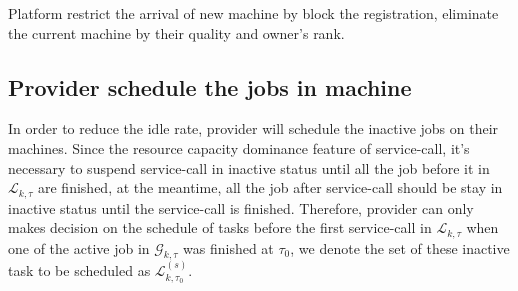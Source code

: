 Platform restrict the arrival of new machine by block the registration, eliminate the current machine by their quality and owner's rank.




\subsection{Provider schedule the jobs in machine} %
\label{sub:schedule_the_jobs_in_machine}
In order to reduce the idle rate, provider will schedule the inactive jobs on their machines.
Since the  resource capacity dominance feature of service-call, it's necessary to suspend service-call in inactive status until all the job before it in $\mathcal{L}_{k,\tau}$ are finished, at the meantime, all the job after service-call should be stay in inactive status until the service-call is finished.
Therefore, provider can only makes decision on the schedule of tasks before the first service-call in $\mathcal{L}_{k,\tau}$ when one of the active job in $\mathcal{G}_{k,\tau}$ was finished at $\tau_0$, we denote the set of these inactive task to be scheduled as $\mathcal{L}^{(s)}_{k,\tau_0}$.

